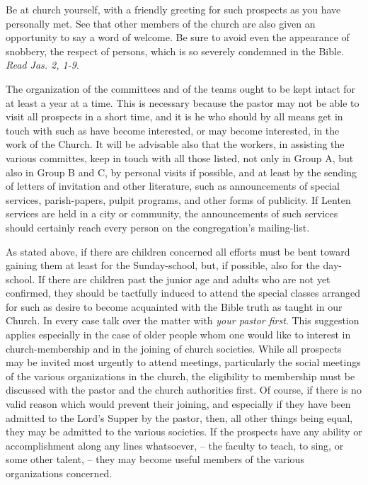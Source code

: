 \documentclass[
]{book}
\begin{document}
Be at church yourself, with a friendly greeting for such prospects as you have personally met. See that other members of the church are also given an opportunity to say a word of welcome. Be sure to avoid even the appearance of snobbery, the respect of persons, which is so severely condemned in the Bible. \emph{Read Jas. 2, 1-9}.

The organization of the committees and of the teams ought to be kept intact for at least a year at a time. This is necessary because the pastor may not be able to visit all prospects in a short time, and it is he who should by all means get in touch with such as have become interested, or may become interested, in the work of the Church. It will be advisable also that the workers, in assisting the various committes, keep in touch with all those listed, not only in Group A, but also in Group B and C, by personal visits if possible, and at least by the sending of letters of invitation and other literature, such as announcements of special services, parish-papers, pulpit programs, and other forms of publicity. If Lenten services are held in a city or community, the announcements of such services should certainly reach every person on the congregation's mailing-list.

As stated above, if there are children concerned all efforts must be bent toward gaining them at least for the Sunday-school, but, if possible, also for the day-school. If there are children past the junior age and adults who are not yet confirmed, they should be tactfully induced to attend the special classes arranged for such as desire to become acquainted with the Bible truth as taught in our Church. In every case talk over the matter with \emph{your pastor first}. This suggestion applies especially in the case of older people whom one would like to interest in church-membership and in the joining of church societies. While all prospects may be invited most urgently to attend meetings, particularly the social meetings of the various organizations in the church, the eligibility to membership must be discussed with the pastor and the church authorities first. Of course, if there is no valid reason which would prevent their joining, and especially if they have been admitted to the Lord's Supper by the pastor, then, all other things being equal, they may be admitted to the various societies. If the prospects have any ability or accomplishment along any lines whatsoever, -- the faculty to teach, to sing, or some other talent, -- they may become useful members of the various organizations concerned.
\end{document}
